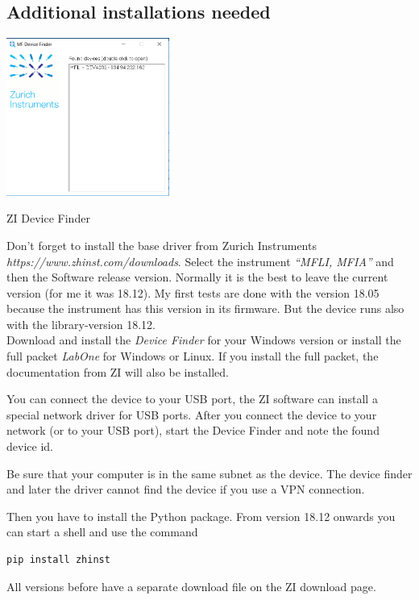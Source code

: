 \documentclass[11pt]{article} %
\begin{document}
\subsection{Additional installations needed}

\begin{floatingfigure}[r]{0.42\textwidth}
\mbox{\includegraphics[width=0.4\textwidth]{ZI-DeviceFinder.png}}
\caption{ZI Device Finder}
\end{floatingfigure}
Don't forget to install the base driver from Zurich Instruments {\it https://www.zhinst.com/downloads}. Select the instrument {\it ``MFLI, MFIA''} and then the Software release version. Normally it is the best to leave the current version (for me it was 18.12). My first tests are done with the version 18.05 because the instrument has this version in its firmware. But the device runs also with the library-version 18.12. \\
Download and install the {\it Device Finder} for your Windows version or install the full packet {\it LabOne} for Windows or Linux. If you install the full packet, the documentation from ZI will also be installed.

You can connect the device to your USB port, the ZI software can install a special network driver for USB ports. After you connect the device to your network (or to your USB port), start the Device Finder and note the found device id.

Be sure that your computer is in the same subnet as the device. The device finder and later the driver cannot find the device if you use a VPN connection.

Then you have to install the Python package. From version 18.12 onwards you can start a shell and use the command
\begin{lstlisting}[frame=single]
pip install zhinst
\end{lstlisting}
All versions before have a separate download file on the ZI download page.

\clearpage
\end{document}
